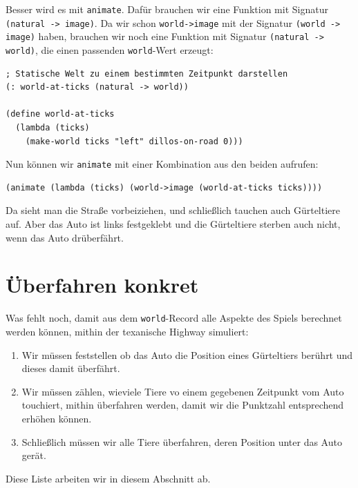 Besser wird es mit \lstinline{animate}.  Dafür brauchen wir eine
Funktion mit Signatur \lstinline{(natural -> image)}.  Da wir schon
\lstinline{world->image} mit der Signatur \lstinline{(world -> image)}
haben, brauchen wir noch eine Funktion mit Signatur
\lstinline{(natural -> world)}, die einen passenden
\lstinline{world}-Wert erzeugt:
%
\begin{lstlisting}
; Statische Welt zu einem bestimmten Zeitpunkt darstellen
(: world-at-ticks (natural -> world))

(define world-at-ticks
  (lambda (ticks)
    (make-world ticks "left" dillos-on-road 0)))
\end{lstlisting}
%
Nun können wir \lstinline{animate} mit einer Kombination aus den
beiden aufrufen:
%
\begin{lstlisting}
(animate (lambda (ticks) (world->image (world-at-ticks ticks))))
\end{lstlisting}
%
Da sieht man die Straße vorbeiziehen, und schließlich tauchen auch
Gürteltiere auf.  Aber das Auto ist links festgeklebt und die
Gürteltiere sterben auch nicht, wenn das Auto drüberfährt.

\section{Überfahren konkret}
  
Was fehlt noch, damit aus dem
\lstinline{world}-Record alle Aspekte des Spiels berechnet werden
können, mithin der texanische Highway simuliert:\label{page:dillo-world-todos}
%
\begin{enumerate}
\item Wir müssen feststellen ob das Auto die Position eines
  Gürteltiers berührt und dieses damit überfährt.
\item Wir müssen zählen, wieviele Tiere vo einem gegebenen
  Zeitpunkt vom Auto touchiert, mithin überfahren werden, damit wir
  die Punktzahl entsprechend erhöhen können.
\item Schließlich müssen wir alle Tiere überfahren, deren Position
  unter das Auto gerät.
\end{enumerate}
%
Diese Liste arbeiten wir in diesem Abschnitt ab.
%
